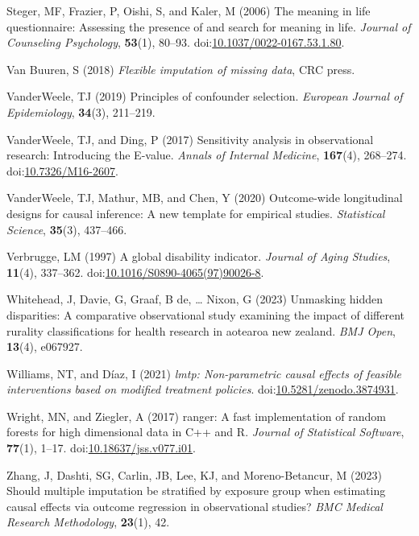 \documentclass[
  single column]{article}
\newlength{\cslhangindent}
\newenvironment{CSLReferences}[2] %
 {\begin{list}{}{%
  \setlength{\itemindent}{0pt}
  \setlength{\leftmargin}{0pt}
  \setlength{\parsep}{0pt}
  \ifodd #1
   \setlength{\leftmargin}{\cslhangindent}
   \setlength{\itemindent}{-1\cslhangindent}
  \fi
  \setlength{\itemsep}{#2\baselineskip}}}
 {\end{list}}
\begin{document}
\begin{CSLReferences}{1}{0}
Steger, MF, Frazier, P, Oishi, S, and Kaler, M (2006) The meaning in
life questionnaire: Assessing the presence of and search for meaning in
life. \emph{Journal of Counseling Psychology}, \textbf{53}(1), 80--93.
doi:\href{https://doi.org/10.1037/0022-0167.53.1.80}{10.1037/0022-0167.53.1.80}.

Van Buuren, S (2018) \emph{Flexible imputation of missing data}, CRC
press.

VanderWeele, TJ (2019) Principles of confounder selection.
\emph{European Journal of Epidemiology}, \textbf{34}(3), 211--219.

VanderWeele, TJ, and Ding, P (2017) Sensitivity analysis in
observational research: Introducing the {E}-value. \emph{Annals of
Internal Medicine}, \textbf{167}(4), 268--274.
doi:\href{https://doi.org/10.7326/M16-2607}{10.7326/M16-2607}.

VanderWeele, TJ, Mathur, MB, and Chen, Y (2020) Outcome-wide
longitudinal designs for causal inference: A new template for empirical
studies. \emph{Statistical Science}, \textbf{35}(3), 437--466.

Verbrugge, LM (1997) A global disability indicator. \emph{Journal of
Aging Studies}, \textbf{11}(4), 337--362.
doi:\href{https://doi.org/10.1016/S0890-4065(97)90026-8}{10.1016/S0890-4065(97)90026-8}.

Whitehead, J, Davie, G, Graaf, B de, \ldots{} Nixon, G (2023) Unmasking
hidden disparities: A comparative observational study examining the
impact of different rurality classifications for health research in
aotearoa new zealand. \emph{BMJ Open}, \textbf{13}(4), e067927.

Williams, NT, and Díaz, I (2021) \emph{{l}mtp: Non-parametric causal
effects of feasible interventions based on modified treatment policies}.
doi:\href{https://doi.org/10.5281/zenodo.3874931}{10.5281/zenodo.3874931}.

Wright, MN, and Ziegler, A (2017) {ranger}: A fast implementation of
random forests for high dimensional data in {C++} and {R}. \emph{Journal
of Statistical Software}, \textbf{77}(1), 1--17.
doi:\href{https://doi.org/10.18637/jss.v077.i01}{10.18637/jss.v077.i01}.

Zhang, J, Dashti, SG, Carlin, JB, Lee, KJ, and Moreno-Betancur, M (2023)
Should multiple imputation be stratified by exposure group when
estimating causal effects via outcome regression in observational
studies? \emph{BMC Medical Research Methodology}, \textbf{23}(1), 42.

\end{CSLReferences}
\end{document}
